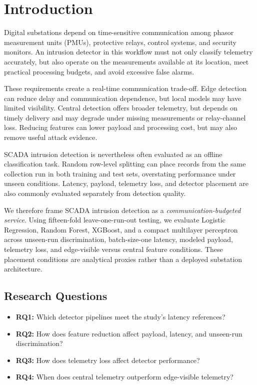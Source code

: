 \documentclass[conference]{IEEEtran}
\begin{document}
\section{Introduction}

Digital substations depend on time-sensitive communication among phasor
measurement units (PMUs), protective relays, control systems, and security
monitors. An intrusion detector in this workflow must not only classify
telemetry accurately, but also operate on the measurements available at its
location, meet practical processing budgets, and avoid excessive false alarms.

These requirements create a real-time communication trade-off. Edge detection
can reduce delay and communication dependence, but local models may have
limited visibility. Central detection offers broader telemetry, but depends on
timely delivery and may degrade under missing measurements or relay-channel
loss. Reducing features can lower payload and processing cost, but may also
remove useful attack evidence.

SCADA intrusion detection is nevertheless often evaluated as an offline
classification task. Random row-level splitting can place records from the
same collection run in both training and test sets, overstating performance
under unseen conditions. Latency, payload, telemetry loss, and detector
placement are also commonly evaluated separately from detection quality.

We therefore frame SCADA intrusion detection as a
\emph{communication-budgeted service}. Using fifteen-fold leave-one-run-out
testing, we evaluate Logistic Regression, Random Forest, XGBoost, and a compact
multilayer perceptron across unseen-run discrimination, batch-size-one latency,
modeled payload, telemetry loss, and edge-visible versus central feature
conditions. These placement conditions are analytical proxies rather than a
deployed substation architecture.

\subsection{Research Questions}

\begin{itemize}
\item \textbf{RQ1:} Which detector pipelines meet the study's latency
references?

\item \textbf{RQ2:} How does feature reduction affect payload, latency, and
unseen-run discrimination?

\item \textbf{RQ3:} How does telemetry loss affect detector performance?

\item \textbf{RQ4:} When does central telemetry outperform edge-visible
telemetry?
\end{itemize}
\end{document}
